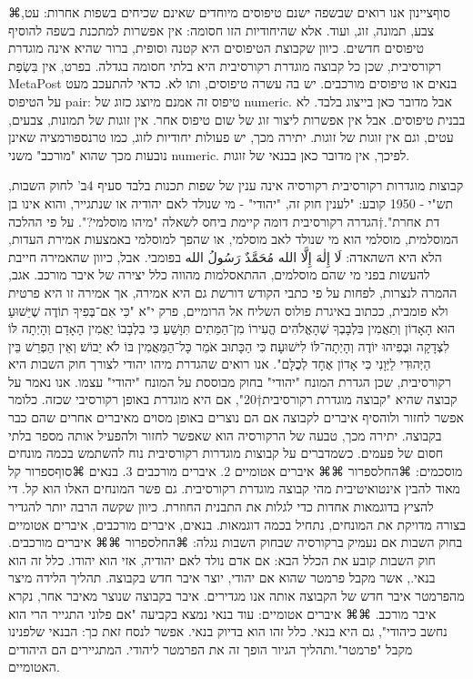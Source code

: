 ⌘סוף{ציינון}
אנו רואים שבשפה ישנם טיפוסים מיוחדים שאינם שכיחים בשפות אחרות: עט, צבע, תמונה,
זוג, ועוד. אלא שהיחודיות הזו חסומה: אין אפשרות למתכנת בשפה להוסיף טיפוסים
חדשים. כיוון שקבוצת הטיפוסים היא קטנה וסופית, ברור שהיא אינה מוגדרת רקורסיבית,
שכן כל קבוצה מוגדרת רקורסיבית היא בלתי חסומה בגדלה. בפרט, אין בִּשְׂפַת MetaPost
בנאים או טיפוסים מורכבים. יש בה עשרה טיפוסים, ותו לא. כדאי להתעכב מעט על
הטיפוס pair: טיפוס זה אמנם מיוצג כזוג של numeric. אבל מדובר כאן בייצוג בלבד. לא
בבנית טיפוסים. אבל אין אפשרות ליצור זוג של שום טיפוס אחר. אין זוגות של תמונות,
צבעים, עטים, וגם אין זוגות של זוגות. יתירה מכך, יש פעולות יחודיות לזוג, כמו
טרנספורמציה שאינן נובעות מכך שהוא "מורכב" משני numeric. לפיכך, אין מדובר כאן
בבנאי של זוגות.

קבוצות מוגדרות רקורסיבית
      רקורסיה אינה ענין של שפות תכנות בלבד
      סעיף 4ב' לחוק השבות, תש"י - 1950 קובע:
      "לענין חוק זה, "יהודי" - מי שנולד לאם יהודיה או שנתגייר, והוא אינו בן דת אחרת".†{הגדרה רקורסיבית דומה קיימת ביחס לשאלה "מיהו מוסלמי?". על פי ההלכה המוסלמית, מוסלמי הוא מי שנולד לאב מוסלמי, או שהפך למוסלמי באמצעות אמירת העדות, הלא היא השהאדה: لَا إِلٰهَ إِلَّا الله مُحَمَّدٌ رَسُولُ الله בפומבי. אבל, כיוון שהאמירה חייבת להעשות בפני מי שהם מוסלמים, ההתאסלמות מהווה כלל יצירה של איבר מורכב. אגב, ההמרה לנצרות, לפחות על פי כתבי הקודש דורשת גם היא אמירה, אך אמירה זו היא פרטית ולא פומבית, ככתוב באיגרת פולוס השליח אל הרומיים, פרק י"א "כִּי אִם־בְּפִיךָ תוֹדֶה שֶׁיֵּשׁוּעַ הוּא הָאָדוֹן וְתַאֲמִין בִּלְבָבְךָ שֶׁהָאֱלֹהִים הֱעִירוֹ מִן־הַמֵּתִים תִּוָּשֵׁעַ׃ כִּי בִלְבָבוֹ יַאֲמִין הָאָדָם וְהָיְתָה לּוֹ לִצְדָקָה וּבְפִיהוּ יוֹדֶה וְהָיְתָה־לּוֹ לִישׁוּעָה׃ כִּי הַכָּתוּב אֹמֵר כָּל־הַמַּאֲמִין בּוֹ לֹא יֵבוֹשׁ׃ וְאֵין הַפְרֵשׁ בֵּין הַיְּהוּדִי לַיְּוָנִי כִּי אָדוֹן אֶחָד לְכֻלָּם".}
      אנו רואים שהגדרת מיהו יהודי לצורך חוק השבות היא רקורסיבית, שכן הגדרת המונח "יהודי" בחוק מבוססת על המונח "יהודי" עצמו.
      אנו נאמר על קבוצה שהיא "קבוצה מוגדרת רקורסיבית†{20}", אם היא מוגדרת באופן רקורסיבי שכזה. כלומר אפשר לחזור ולוהסיף איברים לקבוצה אם הם נוצרים באופן מסוים מאיברים אחרים שהם כבר בקבוצה. יתירה מכך, טבעה של הרקורסיה הוא שאפשר לחזור ולהפעיל אותה מספר בלתי חסום של פעמים.
      כשמדברים על קבוצות מוגדרות רקורסיבית נוח להשתמש בכמה מונחים מוסכמים:
      ⌘החל{ספרור}
      ⌘⌘ איברים אטומיים
      2. איברים מורכבים
      3. בנאים
      ⌘סוף{ספרור}
      קל מאוד להבין אינטואיטיבית מהי קבוצה מוגדרת רקורסיבית. גם פשר המונחים האלו הוא קל. די להציץ בדוגמאות אחדות כדי לגלות את התבנית החוזרת. כיוון שקשה הרבה יותר להגדיר בצורה מדויקת את המונחים, נתחיל בכמה דוגמאות.
      בנאים, איברים מורכבים, איברים אטומיים בחוק השבות
      אם נעמיק ברקורסיה שבחוק השבות נגלה:
      ⌘החל{ספרור}
      ⌘⌘ איברים מורכבים. חוק השבות קובע את הכלל הבא: אם אדם נולד לאם יהודיה, אזי הוא יהודו. כלל זה הוא בנאי., אשר מקבל פרמטר שהוא אם יהודי, יוצר איבר חדש בקבוצה. תהליך הלידה מיצר מהפרמטר איבר חדש של הקבוצה אותה אנו מגדירים. איבר בקבוצה שנוצר מאיבר אחר, נקרא איבר מורכב.
      ⌘⌘ איברים אטומיים: עוד בנאי נמצא בקביעה "אם פלוני התגייר הרי הוא נחשב כיהודי", גם היא בנאי. כלל זהו הוא בדיוק בנאי. אפשר לנסח זאת כך: הבנאי שלפנינו מקבל "פרמטר".ותהליך הגיור הופך זה את הפרמטר ליהודי. המתגיירים הם היהודים האטומיים.

